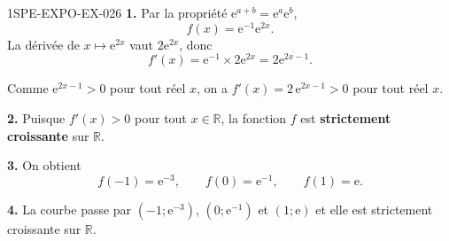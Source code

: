 \begin{corrige}{1SPE-EXPO-EX-026}
\textbf{1.} Par la propriété $\mathrm{e}^{a+b}=\mathrm{e}^a\mathrm{e}^b$,
\[f(x)=\mathrm{e}^{-1}\mathrm{e}^{2x}.\]
La dérivée de $x\mapsto\mathrm{e}^{2x}$ vaut $2\mathrm{e}^{2x}$, donc
\[f'(x)=\mathrm{e}^{-1}\times 2\mathrm{e}^{2x}=2\mathrm{e}^{2x-1}.\]

Comme $\mathrm{e}^{2x-1} > 0$ pour tout réel $x$, on a $f'(x) = 2\,\mathrm{e}^{2x-1} > 0$ pour tout réel $x$.

\textbf{2.} Puisque $f'(x) > 0$ pour tout $x \in \mathbb{R}$, la fonction $f$ est \textbf{strictement croissante} sur $\mathbb{R}$.

\textbf{3.} On obtient
\[f(-1)=\mathrm{e}^{-3},\qquad f(0)=\mathrm{e}^{-1},\qquad f(1)=\mathrm{e}.\]

\textbf{4.} La courbe passe par $(-1;\mathrm{e}^{-3})$, $(0;\mathrm{e}^{-1})$ et $(1;\mathrm{e})$ et elle est strictement croissante sur $\mathbb{R}$.
\end{corrige}

